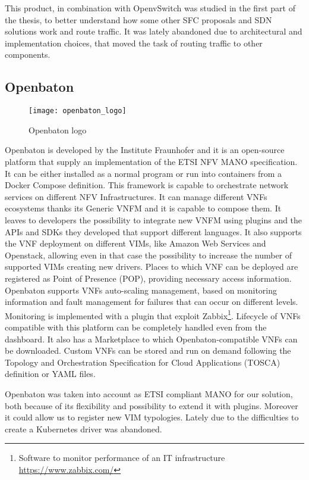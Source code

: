 This product, in combination with OpenvSwitch was studied in the first part of
the thesis, to better understand how some other SFC proposals and SDN solutions
work and route traffic. It was lately abandoned due to architectural and
implementation choices, that moved the task of routing traffic to other
components.

\subsection{Openbaton}
\begin{figure}[h]
  \centering \texttt{[image: openbaton\_logo]}
  \caption{Openbaton logo}
  \label{chap:prjan:img:openbaton_logo}
\end{figure}
Openbaton is developed by the Institute Fraunhofer and it is an open-source
platform that supply an implementation of the ETSI NFV MANO specification. It
can be either installed as a normal program or run into containers from a Docker
Compose definition. This framework is capable to orchestrate network services on
different NFV Infrastructures. It can manage different VNFs ecosystems thanks
its Generic VNFM and it is capable to compose them. It leaves to developers the
possibility to integrate new VNFM using plugins and the APIs and SDKs
they developed that support different languages. It also supports the VNF
deployment on different VIMs, like Amazon Web Services and Openstack, allowing
even in that case the possibility to increase the number of supported VIMs
creating new drivers. Places to which VNF can be deployed are registered as
Point of Presence (POP), providing necessary access information. Openbaton
supports VNFs auto-scaling management, based on monitoring information and fault
management for failures that can occur on different levels. Monitoring
is implemented with a plugin that exploit Zabbix\footnote{Software to monitor
performance of an IT infrastructure \url{https://www.zabbix.com/}}. Lifecycle of
VNFs compatible with this platform can be completely handled even from the
dashboard. It also has a Marketplace to which Openbaton-compatible VNFs can be
downloaded. Custom VNFs can be stored and run on demand following the Topology
and Orchestration Specification for Cloud Applications (TOSCA) definition or
YAML files.

Openbaton was taken into account as ETSI compliant MANO for our solution, both
because of its flexibility and possibility to extend it with plugins. Moreover
it could allow us to register new VIM typologies. Lately due to the difficulties
to create a Kubernetes driver was abandoned.

